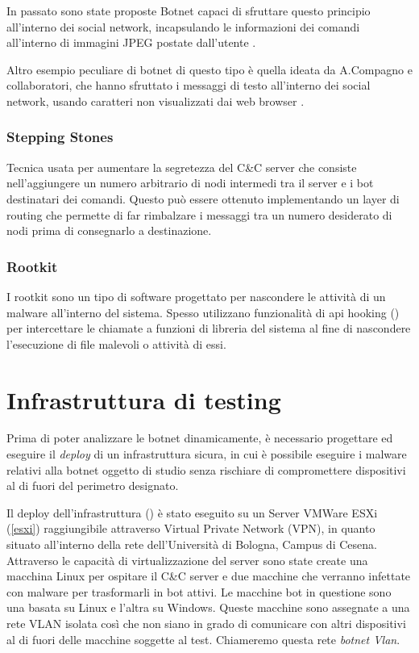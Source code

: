  In passato sono state proposte Botnet capaci di sfruttare questo principio all'interno dei social network, incapsulando le informazioni dei comandi all'interno di immagini JPEG postate dall'utente \cite{nagaraja2011stegobot}.

 Altro esempio peculiare di botnet di questo tipo è quella ideata da A.Compagno e collaboratori, che hanno sfruttato i messaggi di testo all'interno dei social network, usando caratteri non visualizzati dai web browser \cite{nagaraja2011stegobot}.


 \subsection*{Stepping Stones}
 
 Tecnica usata per aumentare la segretezza del C\&C server che consiste nell'aggiungere un numero arbitrario di nodi intermedi tra il server e i bot destinatari dei comandi.  Questo può essere ottenuto implementando un layer di routing che permette di far rimbalzare i messaggi tra un numero desiderato di nodi prima di consegnarlo a destinazione.

\subsection*{Rootkit}
I rootkit sono un tipo di software progettato per nascondere le attività di un malware all'interno del sistema.
Spesso utilizzano funzionalità di api hooking () per intercettare le chiamate a funzioni di libreria del sistema al fine di nascondere l'esecuzione di file malevoli o attività di essi.












 

\chapter{Infrastruttura di testing}
Prima di poter analizzare le botnet dinamicamente, è necessario progettare ed eseguire il \textit{deploy} di un infrastruttura  sicura, in cui è possibile eseguire i malware relativi alla botnet oggetto di studio senza rischiare di compromettere dispositivi al di fuori del perimetro designato.


Il deploy dell'infrastruttura () è stato eseguito su un Server VMWare ESXi (\ref{esxi})  raggiungibile attraverso Virtual Private Network (VPN), in quanto situato all'interno della rete dell'Università di Bologna, Campus di Cesena. Attraverso le capacità di virtualizzazione del server sono state create una macchina Linux per ospitare il C\&C server e due macchine che verranno infettate con malware per trasformarli in bot attivi. Le macchine bot in questione sono una basata su Linux e l'altra su Windows.  Queste macchine sono assegnate a una rete VLAN isolata così che non siano in grado di comunicare con altri dispositivi al di fuori delle macchine soggette al test. Chiameremo questa rete \textit{botnet Vlan}.

